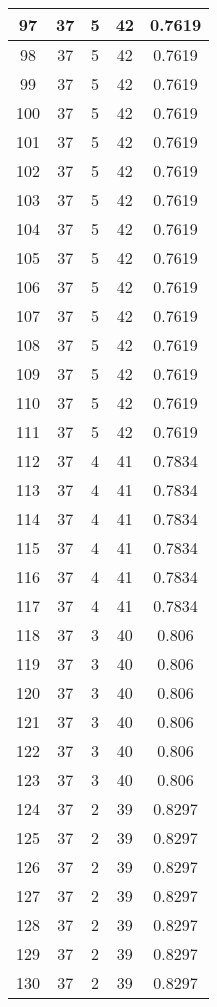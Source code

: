 \documentclass[letterpaper, 12pt]{article}
\begin{document}
\begin{longtable}{|c|c|c|c|c|}
\hline
97 & 37 & 5 & 42 & 0.7619 \\
\hline
98 & 37 & 5 & 42 & 0.7619 \\
\hline
99 & 37 & 5 & 42 & 0.7619 \\
\hline
100 & 37 & 5 & 42 & 0.7619 \\
\hline
101 & 37 & 5 & 42 & 0.7619 \\
\hline
102 & 37 & 5 & 42 & 0.7619 \\
\hline
103 & 37 & 5 & 42 & 0.7619 \\
\hline
104 & 37 & 5 & 42 & 0.7619 \\
\hline
105 & 37 & 5 & 42 & 0.7619 \\
\hline
106 & 37 & 5 & 42 & 0.7619 \\
\hline
107 & 37 & 5 & 42 & 0.7619 \\
\hline
108 & 37 & 5 & 42 & 0.7619 \\
\hline
109 & 37 & 5 & 42 & 0.7619 \\
\hline
110 & 37 & 5 & 42 & 0.7619 \\
\hline
111 & 37 & 5 & 42 & 0.7619 \\
\hline
112 & 37 & 4 & 41 & 0.7834 \\
\hline
113 & 37 & 4 & 41 & 0.7834 \\
\hline
114 & 37 & 4 & 41 & 0.7834 \\
\hline
115 & 37 & 4 & 41 & 0.7834 \\
\hline
116 & 37 & 4 & 41 & 0.7834 \\
\hline
117 & 37 & 4 & 41 & 0.7834 \\
\hline
118 & 37 & 3 & 40 & 0.806 \\
\hline
119 & 37 & 3 & 40 & 0.806 \\
\hline
120 & 37 & 3 & 40 & 0.806 \\
\hline
121 & 37 & 3 & 40 & 0.806 \\
\hline
122 & 37 & 3 & 40 & 0.806 \\
\hline
123 & 37 & 3 & 40 & 0.806 \\
\hline
124 & 37 & 2 & 39 & 0.8297 \\
\hline
125 & 37 & 2 & 39 & 0.8297 \\
\hline
126 & 37 & 2 & 39 & 0.8297 \\
\hline
127 & 37 & 2 & 39 & 0.8297 \\
\hline
128 & 37 & 2 & 39 & 0.8297 \\
\hline
129 & 37 & 2 & 39 & 0.8297 \\
\hline
130 & 37 & 2 & 39 & 0.8297 \\

\end{longtable}
\end{document}
